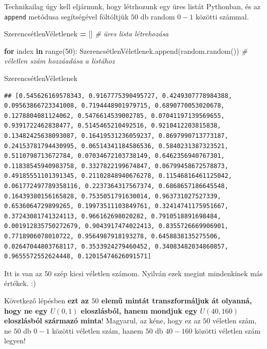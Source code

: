 \documentclass[
]{book}
\newenvironment{Shaded}{\begin{snugshade}}{\end{snugshade}}
\newcommand{\BuiltInTok}[1]{#1}
\newcommand{\CommentTok}[1]{\textcolor[rgb]{0.56,0.35,0.01}{\textit{#1}}}
\newcommand{\ControlFlowTok}[1]{\textcolor[rgb]{0.13,0.29,0.53}{\textbf{#1}}}
\newcommand{\DecValTok}[1]{\textcolor[rgb]{0.00,0.00,0.81}{#1}}
\newcommand{\KeywordTok}[1]{\textcolor[rgb]{0.13,0.29,0.53}{\textbf{#1}}}
\newcommand{\NormalTok}[1]{#1}
\newcommand{\OperatorTok}[1]{\textcolor[rgb]{0.81,0.36,0.00}{\textbf{#1}}}
\begin{document}
Technikailag úgy kell eljárnunk, hogy létrhozunk egy üres listát Pythonban, és az \texttt{append} metódusa segítségével föltöltjük \(50\) db random \(0-1\) közötti számmal.

\begin{Shaded}
\begin{Highlighting}[]
\NormalTok{SzerencsétlenVéletlenek }\OperatorTok{=}\NormalTok{ [] }\CommentTok{\# üres lista létrehozása}

\ControlFlowTok{for}\NormalTok{ index }\KeywordTok{in} \BuiltInTok{range}\NormalTok{(}\DecValTok{50}\NormalTok{):}
\NormalTok{  SzerencsétlenVéletlenek.append(random.random()) }\CommentTok{\# véletlen szám hozzáadása a listához}

\NormalTok{SzerencsétlenVéletlenek}
\end{Highlighting}
\end{Shaded}

\begin{verbatim}
## [0.545626169578343, 0.9167775390495727, 0.4249307778984388, 0.09563866723341008, 0.7194448901979715, 0.6890770053020678, 0.1278804081124062, 0.5476614539002785, 0.07041197139569655, 0.9391722462838477, 0.5145465210492516, 0.9210412203815838, 0.13482425638093087, 0.16419531236059237, 0.8697990713773187, 0.24153781794430995, 0.06514341184586536, 0.5840231387323521, 0.5110798713672784, 0.07034672103738149, 0.6462356940767301, 0.11838545940983758, 0.3327822199674847, 0.06799458672578873, 0.49185551101391345, 0.21102848940676278, 0.11546816461125042, 0.061772497789358116, 0.2237364317567374, 0.6868657186645548, 0.16439380156165828, 0.7535051791630014, 0.963731027527339, 0.6536064729899265, 0.19973511103849761, 0.32414741175951667, 0.37243081741324113, 0.966162698020282, 0.7910518891698484, 0.001912835750272679, 0.9043917474022413, 0.8355726669906901, 0.7718906078010722, 0.9564987918193278, 0.6458838135275506, 0.02647044803768117, 0.3533924279460452, 0.34083482034860857, 0.9655572552624448, 0.12015474626091571]
\end{verbatim}

Itt is van az \(50\) szép kicsi véletlen számom. Nyilván ezek megint mindenkinek más értékek. :)

Következő lépésben \textbf{ezt az \(50\) elemű mintát transzformáljuk át olyanná, hogy ne egy \(U(0,1)\) eloszlásból, hanem mondjuk egy \(U(40,160)\) eloszlásból származó minta}! Magyarul, az kéne, hogy ez az \(50\) véletlen szám, ne \(50\) db \(0-1\) közötti véletlen szám, hanem \(50\) db \(40-160\) közötti véletlen szám legyen!
\end{document}
